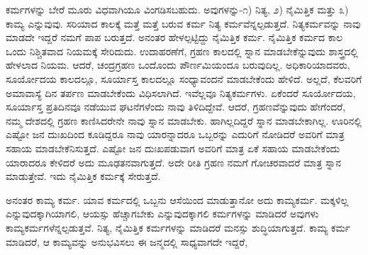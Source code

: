 ಕರ್ಮಗಳನ್ನು ಬೇರೆ ಮೂರು ವಿಧವಾಗಿಯೂ ವಿಂಗಡಿಸಬಹುದು. ಅವುಗಳನ್ನು-೧) ನಿತ್ಯ, ೨) ನೈಮಿತ್ತಿಕ ಮತ್ತು ೩) ಕಾಮ್ಯ ಎನ್ನುವುವು. ಸರಿಯಾದ ಕಾಲಕ್ಕೆ ಮತ್ತೆ ಮತ್ತೆ ಬರುವ ಕರ್ಮ ನಿತ್ಯ ಕರ್ಮವೆನ್ನಲ್ಪಡುತ್ತದೆ. ನಿತ್ಯಕರ್ಮವನ್ನು ನಾವು ಮಾಡದೇ ಇದ್ದರೆ ನಮಗೆ ಪಾಪ ಬರುತ್ತದೆ. ಅನಂತರ ಹೇಳಲ್ಪಟ್ಟಿದ್ದು ನೈಮಿತ್ತಿಕ ಕರ್ಮ. ನೈಮಿತ್ತಿಕ ಕರ್ಮದ ಕಾಲ ಒಂದು ನಿಶ್ಚಿತವಾದ ನಿಯಮಕ್ಕೆ ಸೇರಿದುದು. ಉದಾಹರಣೆಗೆ, ಗ್ರಹಣ ಕಾಲದಲ್ಲಿ ಸ್ನಾನ ಮಾಡಬೇಕೆನ್ನುವುದು ಶಾಸ್ತ್ರದಲ್ಲಿ ಹೇಳಲಾದ ನಿಯಮ. ಆದರೆ, ಚಂದ್ರಗ್ರಹಣ ಒಂದೊಂದು ಪೌರ್ಣಮಿಯಂದೂ ಬರುವುದಿಲ್ಲ. ಅಧಿಕಾರಿಯಾದವರು, ಸೂರ್ಯೋದಯ ಕಾಲದಲ್ಲೂ, ಸೂರ್ಯಾಸ್ತ ಕಾಲದಲ್ಲೂ ಸಂಧ್ಯಾವಂದನೆ ಮಾಡಬೇಕೆಂದು ಹೇಳಿದೆ. ಅಲ್ಲದೆ, ಕೆಲವರಿಗೆ ಅಮಾವಾಸ್ಯೆ ದಿನ ತರ್ಪಣ ಮಾಡಬೇಕೆಂದು ವಿಧಿಸಲಾಗಿದೆ. ಇವೆಲ್ಲವೂ ನಿತ್ಯಕರ್ಮಗಳು. ಏಕೆಂದರೆ ಸೂರ್ಯೋದಯ, ಸೂರ್ಯಾಸ್ತ ಪ್ರತಿದಿನವೂ ನಡೆಯುವ ಘಟನೆಗಳೆಂದು ನಾವು ತಿಳಿದಿದ್ದೇವೆ. ಆದರೆ, ಗ್ರಹಣವೆನ್ನುವುದು ಹೇಗೆಂದರೆ, ನಮ್ಮ ದೇಶದಲ್ಲಿ ಗ್ರಹಣ ಕಾಣಿಸಿದರೇನೇ ನಾವು ಸ್ನಾನ ಮಾಡಬೇಕು. ಹಾಗಿಲ್ಲದಿದ್ದರೆ ಸ್ನಾನ ಮಾಡಬೇಕಾಗಿಲ್ಲ. ಊರಿನಲ್ಲಿ ಎಷ್ಟೋ ಜನ ದುಃಖದಿಂದ ಕೂಡಿದ್ದರೂ ನಾವು ಯಾರನ್ನಾದರೂ ಒಬ್ಬರನ್ನು ಎದುರಿಗೆ ನೋಡಿದರೆ ಅವರಿಗೆ ಮಾತ್ರ ಸಹಾಯ ಮಾಡಬೇಕೆನಿಸುತ್ತದೆ. ಎಷ್ಟೋ ಜನ ದುಃಖಪಡುವಾಗ ಅವರಿಗೆ ಮಾತ್ರ ಏಕೆ ಸಹಾಯ ಮಾಡಬೇಕೆಂದು ಯಾರಾದರೂ ಕೇಳಿದರೆ ಅದು ಮೂಢತನವಾಗುತ್ತದೆ. ಅದೇ ರೀತಿ ಗ್ರಹಣ ನಮಗೆ ಗೋಚರವಾದರೆ ಮಾತ್ರ ಸ್ನಾನ ಮಾಡುತ್ತೇವೆ. ಇದು ನೈಮಿತ್ತಿಕ ಕರ್ಮಕ್ಕೆ ಸೇರುತ್ತದೆ.

ಅನಂತರ ಕಾಮ್ಯ ಕರ್ಮ. ಯಾವ ಕರ್ಮದಲ್ಲಿ ಒಬ್ಬನು ಆಸೆಯಿಂದ ಮಾಡುತ್ತಾನೋ ಅದು ಕಾಮ್ಯಕರ್ಮ. ಮಕ್ಕಳಿಲ್ಲ ಎನ್ನುವುದಕ್ಕಾಗಿಯಾಗಲಿ, ಆಯಸ್ಸು ಹೆಚ್ಚಾಗಬೇಕು ಎನ್ನುವುದಕ್ಕಾಗಲಿ ಕರ್ಮಗಳನ್ನು ಮಾಡಿದರೆ ಅವುಗಳು ಕಾಮ್ಯಕರ್ಮಗಳೆನ್ನಲ್ಪಡುತ್ತವೆ. ನಿತ್ಯ, ನೈಮಿತ್ತಿಕ ಕರ್ಮಗಳನ್ನು ಮಾಡಿದರೆ ಮನಸ್ಸು ಶುದ್ಧಿಯಾಗುತ್ತದೆ. ಕಾಮ್ಯ ಕರ್ಮ ಮಾಡಿದರೆ, ಆ ಕಾಮ್ಯವನ್ನು ಅನುಭವಿಸಲು ಈ ಜನ್ಮದಲ್ಲಿ ಸಾಧ್ಯವಾಗದೇ ಇದ್ದರೆ,





